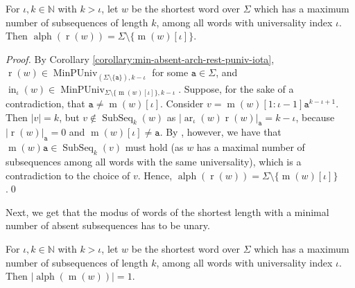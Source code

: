 \documentclass[runningheads,UKenglish,cleveref, autoref, thm-restate]{llncs}
\newcommand{\N}{\mathbb{N}}
\def\ta{\mathtt{a}}
\def\r{\operatorname{r}}
\def\m{\operatorname{m}}
\DeclareMathOperator{\arch}{ar}
\DeclareMathOperator{\alphabet}{alph}
\DeclareMathOperator\ScatFact{SubSeq}
\DeclareMathOperator{\MinPerfUniv}{MinPUniv}
\DeclareMathOperator{\inner}{in}
\newif\ifpaper
\begin{document}
\ifpaper
\else
\begin{lemma}\label{lemma:min-absent-rest-no-last-modus}
    For $\iota, k\in\N$ with $k > \iota$, let $w$ be the shortest word over $\Sigma$ which has a maximum number of subsequences of length $k$, among all words with universality index $\iota$.
    Then $\alphabet(\r(w)) = \Sigma \setminus \{\m(w)[\iota]\}$.
\end{lemma}

\begin{proof}
	By Corollary \ref{corollary:min-absent-arch-rest-puniv-iota}, $\r(w)\in\MinPerfUniv_{(\Sigma\setminus\{\ta\}),k-\iota}$
	for some $\ta\in\Sigma$, and $\inner_{\iota}(w)\in\MinPerfUniv_{\Sigma\setminus\{\m(w)[\iota]\},k-\iota}$.
	Suppose, for the sake of a contradiction, that $\ta\neq\m(w)[\iota]$.
	Consider $v = \m(w)[1:\iota-1]\ta^{k-\iota+1}$.
	Then $\vert v\vert  = k$, but $v\notin\ScatFact_k(w)$ as $\vert \arch_{\iota}(w)\r(w)\vert _{\ta} = k-\iota$, because
	$\vert \r(w)\vert _\ta = 0$ and $\m(w)[\iota] \neq \ta$. By  , however, we have that $\m(w)\ta\in\ScatFact_k(v)$ must hold (as $w$ has a maximal number of subsequences among all words with the same universality), which is a contradiction to the choice of $v$.
	Hence, $\alphabet(\r(w)) = \Sigma\setminus\{\m(w)[\iota]\}$.\qed
\end{proof}
\fi

\ifpaper
\else
Next, we get that the modus of words of the shortest length with a minimal number of absent subsequences has to be unary.
\fi


\ifpaper
\else
\begin{lemma}\label{lemma:min-abs-shortest-word-unary-modus}
    For $\iota, k\in\N$ with $k > \iota$, let $w$ be the shortest word over $\Sigma$ which has a maximum number of subsequences of length $k$, among all words with universality index $\iota$.
    Then $\vert \alphabet(\m(w))\vert  = 1$.
\end{lemma}
\end{document}
